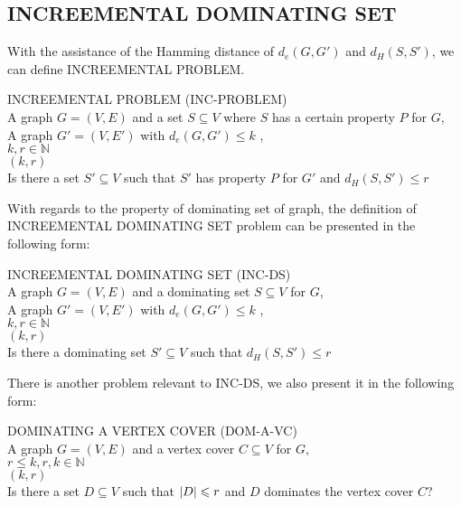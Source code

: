 \subsection{\large{I}\normalsize{NCREEMENTAL} \large{D}\normalsize{OMINATING} \Large{S}\normalsize{ET}}\label{subsec:incds}
With the assistance of the Hamming distance of $d_e$$(G,G')$ and $d_H$$(S,S')$, we can define \large{I}\normalsize{NCREEMENTAL} \large{P}\normalsize{ROBLEM}.
\begin{dproblem}
{\sc \large{I}\normalsize{NCREEMENTAL} \large{P}\normalsize{ROBLEM} (\large{I}\normalsize{NC}-\large{P}\normalsize{ROBLEM})}\\
\instance A graph $G=(V,E)$ and a set $S \subseteq V$ where $S$ has a certain property  $P$ for $G$,\\
  A graph $G'=(V,E')$ with $d_e$$(G,G') \leqslant k$ , \\
  $k,r \in \mathds{N}$ \\
\parameter $(k,r)$ \\
\ques Is there a set $S' \subseteq V$ such that $S'$ has property  $P$ for $G'$ and $d_H$$(S,S') \leqslant r$\\
\cite{downey2014}
\end{dproblem}
With regards to the property of dominating set of graph, the definition of \large{I}\normalsize{NCREEMENTAL} \large{D}\normalsize{OMINATING}  \Large{S}\normalsize{ET} problem can be presented in the following form:
\begin{dproblem}
{\sc \large{I}\normalsize{NCREEMENTAL} \large{D}\normalsize{OMINATING}  \Large{S}\normalsize{ET} \large{(}\large{I}\normalsize{NC}-\large{DS}\large{)}}\\
\instance A graph $G=(V,E)$ and a dominating set $S \subseteq V$ for $G$,\\
  A graph $G'=(V,E')$ with $d_e$$(G,G') \leqslant k$ , \\
  $k,r \in \mathds{N}$ \\
\parameter $ (k,r)$ \\
\ques  Is there a dominating set $S' \subseteq V$ such that $d_H$$(S,S') \leqslant r$\\
\cite{downey2014}
\end{dproblem}
There is another problem relevant to \large{I}\normalsize{NC}-\large{DS}, \normalsize{we also present it in the following form:}
\begin{dproblem}
{\sc \large{D}\normalsize{OMINATING} \large{A} \large{V}\normalsize{ERTEX}  \Large{C}\normalsize{OVER} \large{(}\large{D}\normalsize{OM}-\large{A}-\large{VC}\large{)}}\\
\instance A graph $G=(V,E)$ and a vertex cover $C \subseteq V$ for $G$,\\
   $r \leqslant k, r,k \in \mathds{N}$ \\
\parameter $ (k,r)$ \\
\ques  Is there a set $D \subseteq V$ such that $\left| D \right| \leqslant r$ and $D$ dominates the vertex cover $C$?\\
\cite{downey2014}
\end{dproblem}
